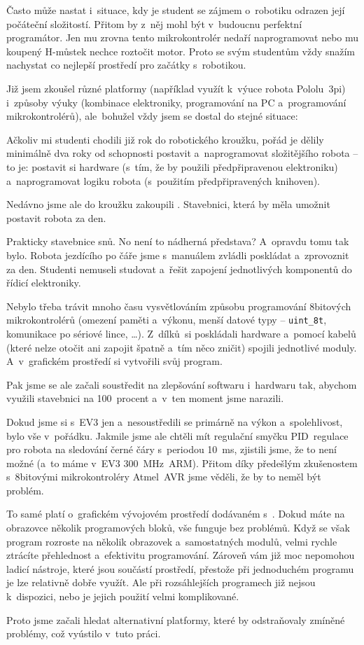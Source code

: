 Často může nastat i~situace, kdy je student se zájmem o~robotiku odrazen její počáteční složitostí.
Přitom by z~něj mohl být v~budoucnu perfektní programátor. 
Jen mu zrovna tento mikrokontrolér nedaří naprogramovat nebo mu koupený H-můstek nechce roztočit motor.
Proto se svým studentům vždy snažím nachystat co nejlepší prostředí pro začátky s~robotikou. 

Již jsem zkoušel různé platformy (například využít k~výuce robota Pololu~3pi) i~způsoby výuky (kombinace elektroniky, programování na PC a~programování mikrokontrolérů), ale~bohužel vždy jsem se dostal do stejné situace:

Ačkoliv mi studenti chodili již rok do robotického kroužku, pořád je dělily minimálně dva roky od schopnosti postavit a~naprogramovat složitějšího robota -- to je: postavit si hardware (s~tím, že by použili předpřipravenou elektroniku) a~naprogramovat logiku robota (s~použitím předpřipravených knihoven).

Nedávno jsme ale do kroužku zakoupili \legoEV{}. 
Stavebnici, která by měla umožnit postavit robota za den. 

Prakticky stavebnice snů. No není to nádherná představa?
A~opravdu tomu tak bylo. Robota jezdícího po čáře jsme s~manuálem zvládli poskládat a~zprovoznit za den. 
Studenti nemuseli studovat a~řešit zapojení jednotlivých komponentů do řídicí elektroniky. 

Nebylo třeba trávit mnoho času vysvětlováním způsobu programování 8bitových mikrokontrolérů (omezení paměti a~výkonu, menší datové typy -- \verb|uint_8t|, komunikace po sériové lince, \dots). 
Z~dílků~\lega{ }si poskládali hardware a~pomocí kabelů (které nelze otočit ani zapojit špatně a~tím něco zničit) spojili jednotlivé moduly. A~v~grafickém prostředí si vytvořili svůj program.


Pak jsme se ale začali soustředit na zlepšování softwaru i~hardwaru tak, abychom využili stavebnici na 100~procent a~v~ten moment jsme narazili.

Dokud jsme si s~EV3 jen  a~nesoustředili se primárně na výkon a~spolehlivost, bylo vše v~pořádku. 
Jakmile jsme ale chtěli mít regulační smyčku PID~regulace pro robota na sledování černé čáry s~periodou 10~ms, zjistili jsme, že to není možné (a~to máme v~EV3  300~MHz~ARM). Přitom díky předešlým zkušenostem s~8bitovými mikrokontroléry Atmel~AVR jsme věděli, že by to neměl být problém.


To samé platí o~grafickém vývojovém prostředí dodávaném s~\EVthree. Dokud máte na obrazovce několik programových bloků, vše funguje bez problémů. 
Když se však program rozroste na několik obrazovek a~samostatných modulů, velmi rychle ztrácíte přehlednost a~efektivitu programování.
Zároveň vám již moc nepomohou ladicí nástroje, které jsou součástí prostředí, přestože při jednoduchém programu je lze relativně dobře využít. Ale při rozsáhlejších programech již nejsou k~dispozici, nebo je jejich použití velmi komplikované. 


Proto jsme začali hledat alternativní platformy, které by odstraňovaly zmíněné problémy, což vyústilo v~tuto práci.   

